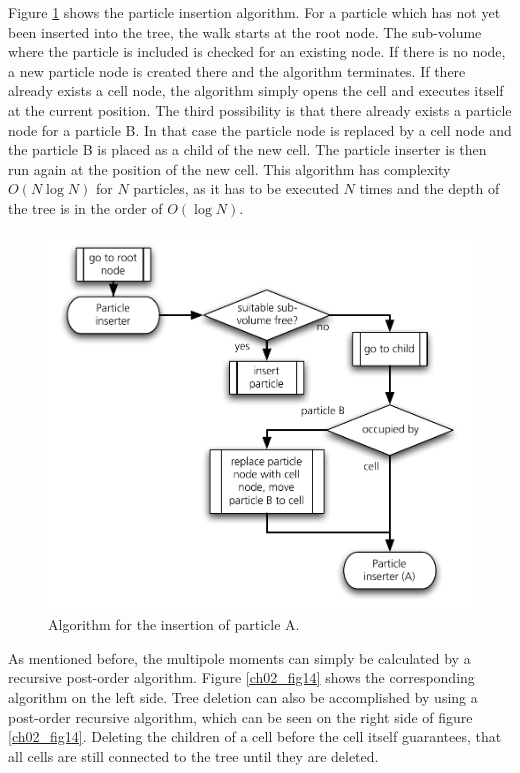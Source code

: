 Figure \ref{ch02_fig13} shows the particle insertion algorithm. For a particle which has not yet  been inserted into the tree, the walk starts at the root node. The sub-volume where the particle is included is checked for an existing node. If there is no node, a new particle node is created there and the algorithm terminates. If there already exists a cell node, the algorithm simply opens the cell and executes itself at the current position. The third possibility is that there already exists a particle node for a particle B. In that case the particle node is replaced by a cell node and the particle B is placed as a child of the new cell. The particle inserter is then run again at the position of the new cell. This algorithm has complexity $O(N \log{N})$ for $N$ particles, as it has to be executed $N$ times and the depth of the tree is in the order of $O(\log{N})$.
\begin{figure}[htbp]
\begin{center}
\includegraphics[scale=0.6]{13algo_particle_insert.pdf}
\caption{Algorithm for the insertion of particle A.}
\label{ch02_fig13}
\end{center}
\end{figure}

As mentioned before, the multipole moments can simply be calculated by a recursive post-order algorithm. Figure \ref{ch02_fig14} shows the corresponding algorithm on the left side. Tree deletion can also be accomplished by using a post-order recursive algorithm, which can be seen on the right side of figure \ref{ch02_fig14}. Deleting the children of a cell before the cell itself guarantees, that all cells are still connected to the tree until they are deleted.

